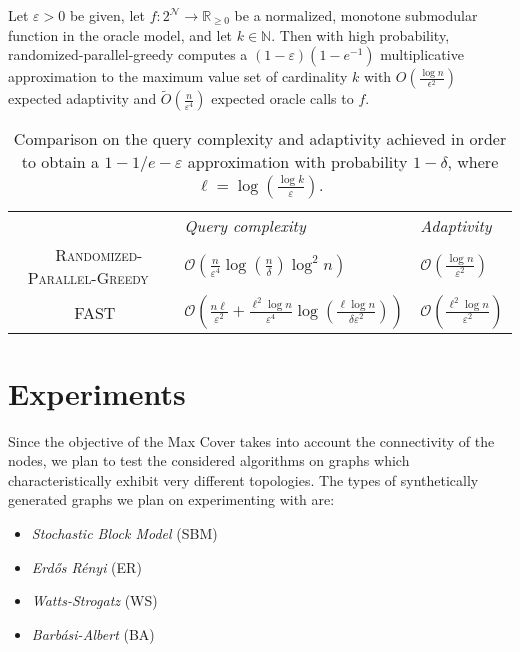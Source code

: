 \documentclass[11pt, a4paper]{article}
\begin{document}
\begin{theorem}
Let $\varepsilon>0$ be given, let $f: 2^{\mathcal{N}} \rightarrow \mathbb{R}_{\geq 0}$ be a normalized, monotone submodular function in the oracle model, and let $k \in \mathbb{N}$. Then with high probability, randomized-parallel-greedy computes a $(1-\varepsilon)\left(1-e^{-1}\right)$ multiplicative approximation to the maximum value set of cardinality $k$ with $O\left(\frac{\log n}{\epsilon^{2}}\right)$ expected adaptivity and $\tilde{O}\left(\frac{n}{\varepsilon^{4}}\right)$ expected oracle calls to $f$.
\end{theorem}

\begin{table}[h]
\begin{center}
\begin{tabular}{cll}\vspace{0.2cm}
        & \emph{Query complexity} & \emph{Adaptivity} &   \\\ \vspace{0.3cm}
 \textsc{Randomized-Parallel-Greedy}~\cite{chekuri2018submodular}& $\mathcal{O}\left(  \frac{n}{\varepsilon^4}  \log\left(\frac{n}{\delta}\right) \log^2 n\right)  $ & $ \mathcal{O}\left(\frac{\log n}{\varepsilon^2}  \right)$ & \\\ \vspace{0.3cm}
  \textsc{FAST}~\cite{breuer2019fast} &     $\mathcal{O}\left(\frac{  n \ell}{\varepsilon^2} +  \frac{ \ell^2 \log n}{\varepsilon^4}   \log(\frac{\ell\log n}{\delta \varepsilon^2})\right)$        &   $\mathcal{O}\left(\frac{ \ell^2 \log n}{\varepsilon^2}\right)$   & 
\end{tabular}
  \caption{Comparison on the query complexity and adaptivity achieved in order to obtain a $1-1/e-\varepsilon$ approximation with probability $1 - \delta$, where  $\ell = \log\left(\frac{\log k}{\varepsilon}\right)$.  }
  \label{tab:queries}
\end{center}
\end{table}


\section{Experiments}

Since the objective of the Max Cover takes into account the connectivity of the nodes, we plan to test the considered algorithms on graphs which characteristically exhibit very different topologies. The types of synthetically generated graphs we plan on experimenting with are:
\begin{itemize}
    \item \emph{Stochastic Block Model} (SBM)
    \item \emph{Erd\H{o}s R\'{e}nyi} (ER)
    \item \emph{Watts-Strogatz} (WS)
    \item \emph{Barb\'{a}si-Albert} (BA)
\end{itemize}
\end{document}
